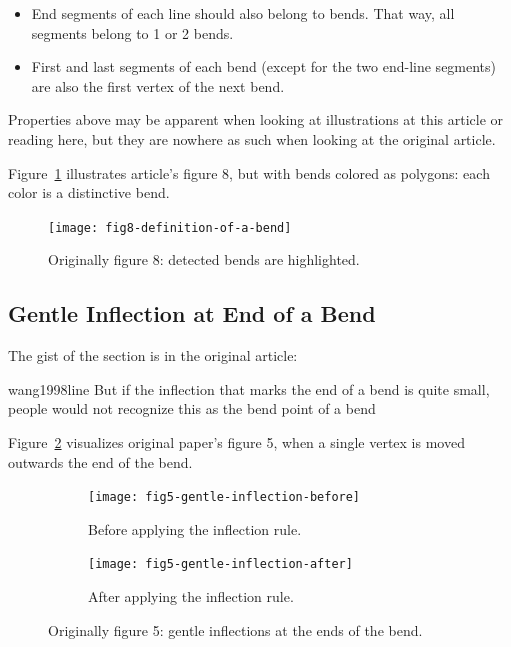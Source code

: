 \documentclass[a4paper]{article}
\begin{document}
\begin{itemize}
    \item End segments of each line should also belong to bends. That way, all
        segments belong to 1 or 2 bends.

    \item First and last segments of each bend (except for the two end-line
        segments) are also the first vertex of the next bend.
\end{itemize}

Properties above may be apparent when looking at illustrations at this article
or reading here, but they are nowhere as such when looking at the original
article.

Figure~\ref{fig:fig8-definition-of-a-bend} illustrates article's figure 8,
but with bends colored as polygons: each color is a distinctive bend.

\begin{figure}[h]
    \centering
    \texttt{[image: fig8-definition-of-a-bend]}
    \caption{Originally figure 8: detected bends are highlighted.}
    \label{fig:fig8-definition-of-a-bend}
\end{figure}

\subsection{Gentle Inflection at End of a Bend}

The gist of the section is in the original article:

\begin{displaycquote}{wang1998line}
    But if the inflection that marks the end of a bend is quite small, people
    would not recognize this as the bend point of a bend
\end{displaycquote}

Figure~\ref{fig:fig5-gentle-inflection} visualizes original paper's figure 5,
when a single vertex is moved outwards the end of the bend.

\begin{figure}[h]
    \centering
    \begin{subfigure}[b]{.49\textwidth}
        \texttt{[image: fig5-gentle-inflection-before]}
        \caption{Before applying the inflection rule.}
    \end{subfigure}
    \hfill
    \begin{subfigure}[b]{.49\textwidth}
        \texttt{[image: fig5-gentle-inflection-after]}
        \caption{After applying the inflection rule.}
    \end{subfigure}
    \caption{Originally figure 5: gentle inflections at the ends of the bend.}
    \label{fig:fig5-gentle-inflection}
\end{figure}
\end{document}
